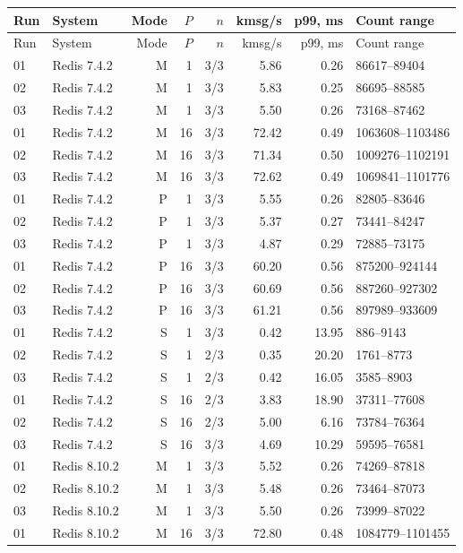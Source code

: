 \begin{longtable}{llrrrrrl}
\toprule
Run & System & Mode & $P$ & $n$ & kmsg/s & p99, ms & Count range\\
\midrule
\endfirsthead
\toprule
Run & System & Mode & $P$ & $n$ & kmsg/s & p99, ms & Count range\\
\midrule
\endhead
01 & Redis 7.4.2 & M & 1 & 3/3 & 5.86 & 0.26 & 86617--89404\\
02 & Redis 7.4.2 & M & 1 & 3/3 & 5.83 & 0.25 & 86695--88585\\
03 & Redis 7.4.2 & M & 1 & 3/3 & 5.50 & 0.26 & 73168--87462\\
01 & Redis 7.4.2 & M & 16 & 3/3 & 72.42 & 0.49 & 1063608--1103486\\
02 & Redis 7.4.2 & M & 16 & 3/3 & 71.34 & 0.50 & 1009276--1102191\\
03 & Redis 7.4.2 & M & 16 & 3/3 & 72.62 & 0.49 & 1069841--1101776\\
01 & Redis 7.4.2 & P & 1 & 3/3 & 5.55 & 0.26 & 82805--83646\\
02 & Redis 7.4.2 & P & 1 & 3/3 & 5.37 & 0.27 & 73441--84247\\
03 & Redis 7.4.2 & P & 1 & 3/3 & 4.87 & 0.29 & 72885--73175\\
01 & Redis 7.4.2 & P & 16 & 3/3 & 60.20 & 0.56 & 875200--924144\\
02 & Redis 7.4.2 & P & 16 & 3/3 & 60.69 & 0.56 & 887260--927302\\
03 & Redis 7.4.2 & P & 16 & 3/3 & 61.21 & 0.56 & 897989--933609\\
01 & Redis 7.4.2 & S & 1 & 3/3 & 0.42 & 13.95 & 886--9143\\
02 & Redis 7.4.2 & S & 1 & 2/3 & 0.35 & 20.20 & 1761--8773\\
03 & Redis 7.4.2 & S & 1 & 2/3 & 0.42 & 16.05 & 3585--8903\\
01 & Redis 7.4.2 & S & 16 & 2/3 & 3.83 & 18.90 & 37311--77608\\
02 & Redis 7.4.2 & S & 16 & 2/3 & 5.00 & 6.16 & 73784--76364\\
03 & Redis 7.4.2 & S & 16 & 3/3 & 4.69 & 10.29 & 59595--76581\\
01 & Redis 8.10.2 & M & 1 & 3/3 & 5.52 & 0.26 & 74269--87818\\
02 & Redis 8.10.2 & M & 1 & 3/3 & 5.48 & 0.26 & 73464--87073\\
03 & Redis 8.10.2 & M & 1 & 3/3 & 5.50 & 0.26 & 73999--87022\\
01 & Redis 8.10.2 & M & 16 & 3/3 & 72.80 & 0.48 & 1084779--1101455\\

\end{longtable}
